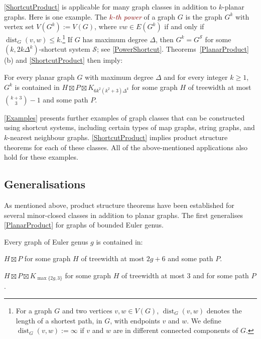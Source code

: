 \documentclass{patmorin}
\newcommand{\defin}[1]{\textcolor{Maroon}{\emph{#1}}}
\DeclareMathOperator{\dist}{dist}
\renewcommand{\SS}{\mathcal{S}}
\renewcommand{\geq}{\geqslant}
\renewcommand{\leq}{\leqslant}
\begin{document}
\cref{ShortcutProduct} is applicable for many graph classes in addition to $k$-planar graphs. Here is one example. The \defin{$k$-th power} of a graph $G$ is the graph $G^k$ with vertex set $V(G^k):=V(G)$, where $vw\in E(G^k)$ if and only if $\dist_G(v,w)\leq k$.\footnote{For a graph $G$ and two vertices $v,w\in V(G)$, $\dist_G(v,w)$  denotes the length of a shortest path, in $G$, with endpoints $v$ and $w$.  We define $\dist_G(v,w):=\infty$ if $v$ and $w$ are in different connected components of $G$.} If $G$ has maximum degree $\Delta$, then $G^k = G^\SS$ for some $(k,2k\Delta^{k})$-shortcut system $\SS$; see \cref{PowerShortcut}. Theorems~\ref{PlanarProduct}(b) and \ref{ShortcutProduct} then imply:

\begin{thm}
\label{kPowerBasic}
For every planar graph $G$ with maximum degree $\Delta$ and for every integer $k\geq 1$, $G^k$ is contained in $H\boxtimes P\boxtimes K_{6k^2(k^2+3)\Delta^{k}}$ for some graph $H$ of treewidth at most $\binom{k+3}{3}-1$ and some path $P$.
\end{thm}

\cref{Examples} presents further examples of graph classes that can be constructed using shortcut systems, including certain types of map graphs, string graphs, and $k$-nearest neighbour graphs. \cref{ShortcutProduct} implies product structure theorems for each of these classes. All of the above-mentioned applications also hold for these examples.

\subsection{Generalisations}
\label{Generalisations}

As mentioned above, product structure theorems have been established for several minor-closed classes in addition to planar graphs. The first generalises \cref{PlanarProduct} for graphs of bounded Euler genus.

\begin{thm}
\label{GenusProduct}
Every graph of Euler genus $g$ is contained in:
\begin{compactenum}[(a)]
\item $H  \boxtimes P$ for some graph $H$ of treewidth at most $2g+6$  and some path $P$.
\item $H \boxtimes P \boxtimes K_{\max\{2g,3\}}$ for some graph $H$ of treewidth at most $3$ and for some path $P$.
\end{compactenum}
\end{thm}
\end{document}
